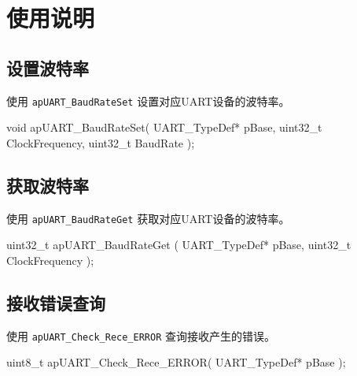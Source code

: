 \documentclass[
  12pt,
]{book}
\newenvironment{Shaded}{\begin{snugshade}}{\end{snugshade}}
\newcommand{\DataTypeTok}[1]{\textcolor[rgb]{0.13,0.29,0.53}{#1}}
\newcommand{\NormalTok}[1]{#1}
\begin{document}
\hypertarget{ux4f7fux7528ux8bf4ux660e-7}{%
\section{使用说明}\label{ux4f7fux7528ux8bf4ux660e-7}}

\hypertarget{ux8bbeux7f6eux6ce2ux7279ux7387}{%
\subsection{设置波特率}\label{ux8bbeux7f6eux6ce2ux7279ux7387}}

使用 \texttt{apUART\_BaudRateSet} 设置对应UART设备的波特率。

\begin{Shaded}
\begin{Highlighting}[]
\DataTypeTok{void}\NormalTok{ apUART_BaudRateSet(}
\NormalTok{  UART_TypeDef* pBase, }
  \DataTypeTok{uint32_t}\NormalTok{ ClockFrequency, }
  \DataTypeTok{uint32_t}\NormalTok{ BaudRate}
\NormalTok{  );}
\end{Highlighting}
\end{Shaded}

\hypertarget{ux83b7ux53d6ux6ce2ux7279ux7387}{%
\subsection{获取波特率}\label{ux83b7ux53d6ux6ce2ux7279ux7387}}

使用 \texttt{apUART\_BaudRateGet} 获取对应UART设备的波特率。

\begin{Shaded}
\begin{Highlighting}[]
\DataTypeTok{uint32_t}\NormalTok{ apUART_BaudRateGet (}
\NormalTok{  UART_TypeDef* pBase, }
  \DataTypeTok{uint32_t}\NormalTok{ ClockFrequency}
\NormalTok{  );}
\end{Highlighting}
\end{Shaded}

\hypertarget{ux63a5ux6536ux9519ux8befux67e5ux8be2}{%
\subsection{接收错误查询}\label{ux63a5ux6536ux9519ux8befux67e5ux8be2}}

使用 \texttt{apUART\_Check\_Rece\_ERROR} 查询接收产生的错误。

\begin{Shaded}
\begin{Highlighting}[]
\DataTypeTok{uint8_t}\NormalTok{ apUART_Check_Rece_ERROR(}
\NormalTok{  UART_TypeDef* pBase}
\NormalTok{  );}
\end{Highlighting}
\end{Shaded}
\end{document}
